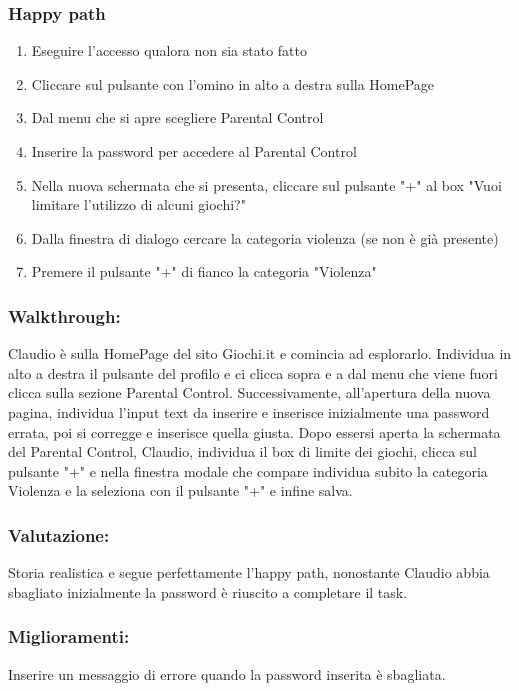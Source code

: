 \documentclass[../Report.tex]{subfiles}
\begin{document}
    \subsubsection{Happy path}
    \begin{enumerate}
        \item Eseguire l'accesso qualora non sia stato fatto 
        \item Cliccare sul pulsante con l’omino in alto a destra sulla HomePage
        \item Dal menu che si apre scegliere Parental Control
        \item Inserire la password per accedere al Parental Control        \item Nella nuova schermata che si presenta, cliccare sul pulsante "+" al box "Vuoi limitare l'utilizzo di alcuni giochi?"
        \item Dalla finestra di dialogo cercare la categoria violenza (se non è già presente)
        \item Premere il pulsante "+" di fianco la categoria "Violenza"
    \end{enumerate}

    \subsubsection{Walkthrough:}
    Claudio è sulla HomePage del sito Giochi.it e comincia ad esplorarlo. Individua in alto a destra il pulsante del profilo e ci clicca sopra e a dal menu che viene fuori clicca sulla sezione Parental Control. Successivamente, all'apertura della nuova pagina, individua l'input text da inserire e inserisce inizialmente una password errata, poi si corregge e inserisce quella giusta. Dopo essersi aperta la schermata del Parental Control, Claudio, individua il box di limite dei giochi, clicca sul pulsante "+" e nella finestra modale che compare individua subito la categoria Violenza e la seleziona con il pulsante "+" e infine salva.  
    \subsubsection{Valutazione:}
    Storia realistica e segue perfettamente l’happy path, nonostante Claudio abbia sbagliato inizialmente la password è riuscito a completare il task. 

    \subsubsection{Miglioramenti:}
    Inserire un messaggio di errore quando la password inserita è sbagliata.
\end{document}
